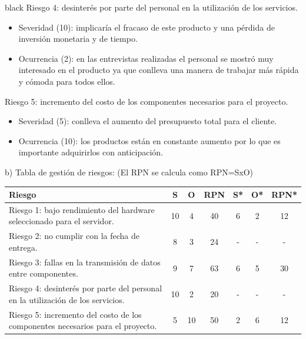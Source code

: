 \documentclass[11pt]{charter}
\begin{document}
\begin{consigna}{black}
Riesgo 4: desinterés por parte del personal en la utilización de los servicios.
\begin{itemize}
\item Severidad (10): implicaría el fracaso de este producto y una pérdida de inversión monetaria y de tiempo.
\item Ocurrencia (2): en las entrevistas realizadas el personal se mostró muy interesado en el producto ya que conlleva una manera de trabajar más rápida y cómoda para todos ellos.
\end{itemize}

Riesgo 5: incremento del costo de los componentes necesarios para el proyecto.
\begin{itemize}
\item Severidad (5): conlleva el aumento del presupuesto total para el cliente.
\item Ocurrencia (10): los productos están en constante aumento por lo que es importante adquirirlos con anticipación.
\end{itemize}


b) Tabla de gestión de riesgos:      (El RPN se calcula como RPN=SxO)
\begin{table}[htpb]
\centering
\begin{tabularx}{\linewidth}{@{}|X|c|c|c|c|c|c|@{}}
\hline
\rowcolor[HTML]{C0C0C0} 
Riesgo & S & O & RPN & S* & O* & RPN* \\ \hline
 Riesgo 1: bajo rendimiento del hardware seleccionado para el servidor. &10   &4   &40     &6    &2    &12      \\ \hline
 Riesgo 2: no cumplir con la fecha de entrega.  &8   &3   &24     &-    & -   & -     \\ \hline
 Riesgo 3: fallas en la transmisión de datos entre componentes. &9   &7   & 63    &6    &5    &30      \\ \hline
  Riesgo 4: desinterés por parte del personal en la utilización de los servicios.&10   &2   &20     &-    &  -  & -     \\ \hline
   Riesgo 5: incremento del costo de los componentes necesarios para el proyecto. &5   &10   &50     &2    &6    &12      \\ \hline
\end{tabularx}
\end{table}

\end{consigna}
\end{document}
